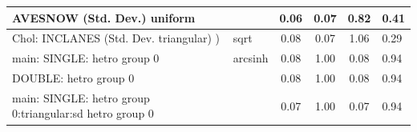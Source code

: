 \begin{table}
\begin{center}
\begin{tabular}{|l|l|c|c|c|l|}
			\hline
			AVESNOW (Std. Dev.) uniform &  & 0.06 & 0.07 & 0.82 & 0.41 \\
			\hline
			 Chol: INCLANES (Std. Dev. triangular) ) & sqrt & 0.08 & 0.07 & 1.06 & 0.29 \\
			\hline
			main: SINGLE: hetro group 0 & arcsinh & 0.08 & 1.00 & 0.08 & 0.94 \\
			\hline
			DOUBLE: hetro group 0 &  & 0.08 & 1.00 & 0.08 & 0.94 \\
			\hline
			main: SINGLE: hetro group 0:triangular:sd  hetro group 0 &  & 0.07 & 1.00 & 0.07 & 0.94 \\
			\hline
		\end{tabular}
	\end{center}
\end{table}